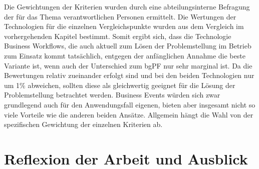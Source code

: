 Die Gewichtungen der Kriterien wurden durch eine abteilungsinterne Befragung der für das Thema verantwortlichen Personen ermittelt. Die Wertungen der Technologien für die einzelnen Vergleichspunkte wurden aus dem Vergleich im vorhergehenden Kapitel bestimmt. Somit ergibt sich, dass die Technologie Business Workflows, die auch aktuell zum Lösen der Problemstellung im Betrieb zum Einsatz kommt tatsächlich, entgegen der anfänglichen Annahme die beste Variante ist, wenn auch der Unterschied zum bgPF nur sehr marginal ist. Da die Bewertungen relativ zueinander erfolgt sind und bei den beiden Technologien nur um 1\% abweichen, sollten diese als gleichwertig geeignet für die Lösung der Problemstellung betrachtet werden. Business Events würden sich zwar grundlegend auch für den Anwendungsfall eigenen, bieten aber insgesamt nicht so viele Vorteile wie die anderen beiden Ansätze. Allgemein hängt die Wahl von der spezifischen Gewichtung der einzelnen Kriterien ab. 

\section{Reflexion der Arbeit und Ausblick}


